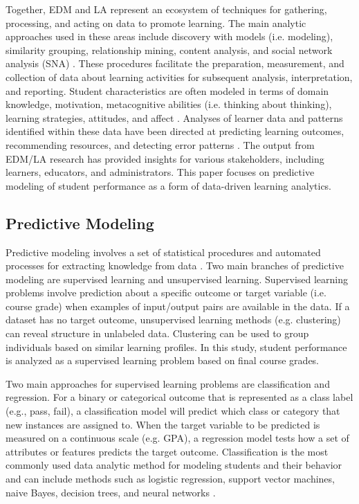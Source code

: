 \documentclass[sigconf]{acmart}
\begin{document}

Together, EDM and LA represent an ecosystem of techniques for gathering, 
processing, and acting on data to promote learning. The main analytic approaches 
used in these areas include discovery with models (i.e. modeling), similarity 
grouping, relationship mining, content analysis, and social network analysis 
(SNA) \cite{baker09, siemensbaker12}. These procedures facilitate the 
preparation, measurement, and collection of data about learning activities 
for subsequent analysis, interpretation, and reporting. Student characteristics 
are often modeled in terms of domain knowledge, motivation, metacognitive 
abilities (i.e. thinking about thinking), learning strategies, attitudes, and 
affect \cite{papamitsiou14}. Analyses of learner data and patterns identified 
within these data have been directed at predicting learning outcomes, 
recommending resources, and detecting error patterns \cite{verbert12}. The 
output from EDM/LA research has provided insights for various stakeholders, 
including learners, educators, and administrators. This paper focuses on 
predictive modeling of student performance as a form of data-driven 
learning analytics. 


\subsection{Predictive Modeling}

Predictive modeling involves a set of statistical procedures and automated 
processes for extracting knowledge from data \cite{jamesetal13, kuhn13}. Two 
main branches of predictive modeling are supervised learning and unsupervised 
learning. Supervised learning problems involve prediction about a specific 
outcome or target variable (i.e. course grade) when examples of input/output 
pairs are available in the data. If a dataset has no target outcome, 
unsupervised learning methods (e.g. clustering) can reveal structure in 
unlabeled data. Clustering can be used to group individuals based 
on similar learning profiles. In this study, student performance is analyzed
as a supervised learning problem based on final course grades. 


Two main approaches for supervised learning problems are classification and 
regression. For a binary or categorical outcome that is represented as a class 
label (e.g., pass, fail), a classification model will predict which class or 
category that new instances are assigned to. When the target variable to be 
predicted is measured on a continuous scale (e.g. GPA), a regression model 
tests how a set of attributes or features predicts the target outcome. 
Classification is the most commonly used data analytic method for modeling 
students and their behavior and can include methods such as logistic 
regression, support vector machines, naive Bayes, decision trees, and 
neural networks \cite{Lykourentzou09}. 
\end{document}

